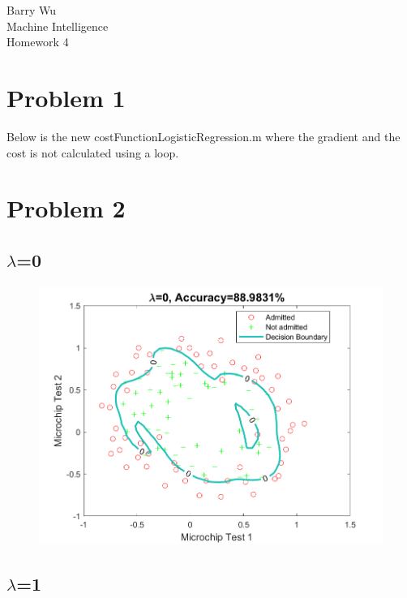 \documentclass{article}
\begin{document}
Barry Wu\\
Machine Intelligence\\
Homework 4\\

\section*{Problem 1}
Below is the new costFunctionLogisticRegression.m where the gradient and the cost is not calculated using a loop.



\newpage

\section*{Problem 2}
\subsection*{{$\lambda$}=0}


\begin{figure}[H]
\includegraphics[scale = 0.75]{hwk4_problem2_lambda_0_plot.png}
\end{figure}

\subsection*{{$\lambda$}=1}

\end{document}

